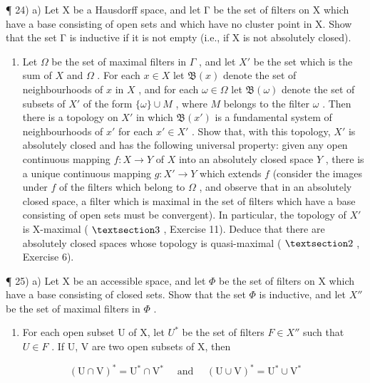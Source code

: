 ¶ 24) a) Let X be a Hausdorff space, and let Γ be the set of filters on X which have a base consisting of open sets and which have no cluster point in X. Show that the set Γ is inductive if it is not empty (i.e., if X is not absolutely closed).

\begin{enumerate}
\def\labelenumi{\alph{enumi})}
\setcounter{enumi}{1}
\tightlist
\item
  Let \(\Omega\) be the set of maximal filters in \(\Gamma\) , and let \(X'\) be the set which is the sum of \(X\) and \(\Omega\) . For each \(x \in X\) let \(\mathfrak{B}(x)\) denote the set of neighbourhoods of \(x\) in \(X\) , and for each \(\omega \in \Omega\) let \(\mathfrak{B}(\omega)\) denote the set of subsets of \(X'\) of the form \(\{\omega\} \cup M\) , where \(M\) belongs to the filter \(\omega\) . Then there is a topology on \(X'\) in which \(\mathfrak{B}(x')\) is a fundamental system of neighbourhoods of \(x'\) for each \(x' \in X'\) . Show that, with this topology, \(X'\) is absolutely closed and has the following universal property: given any open continuous mapping \(f: X \to Y\) of \(X\) into an absolutely closed space \(Y\) , there is a unique continuous mapping \(g: X' \to Y\) which extends \(f\) (consider the images under \(f\) of the filters which belong to \(\Omega\) , and observe that in an absolutely closed space, a filter which is maximal in the set of filters which have a base consisting of open sets must be convergent). In particular, the topology of \(X'\) is X-maximal ( \(\S 3\) , Exercise 11). Deduce that there are absolutely closed spaces whose topology is quasi-maximal ( \(\S 2\) , Exercise 6).
\end{enumerate}

¶ 25) a) Let X be an accessible space, and let \(\Phi\) be the set of filters on X which have a base consisting of closed sets. Show that the set \(\Phi\) is inductive, and let \(X''\) be the set of maximal filters in \(\Phi\) .

\begin{enumerate}
\def\labelenumi{\alph{enumi})}
\setcounter{enumi}{1}
\tightlist
\item
  For each open subset U of X, let \(U^{*}\) be the set of filters \(F \in X''\) such that \(U \in F\) . If U, V are two open subsets of X, then
\end{enumerate}

\[
(\mathrm{U} \cap \mathrm{V}) ^ {*} = \mathrm{U} ^ {*} \cap \mathrm{V} ^ {*} \quad \text { and } \quad (\mathrm{U} \cup \mathrm{V}) ^ {*} = \mathrm{U} ^ {*} \cup \mathrm{V} ^ {*}
\]

